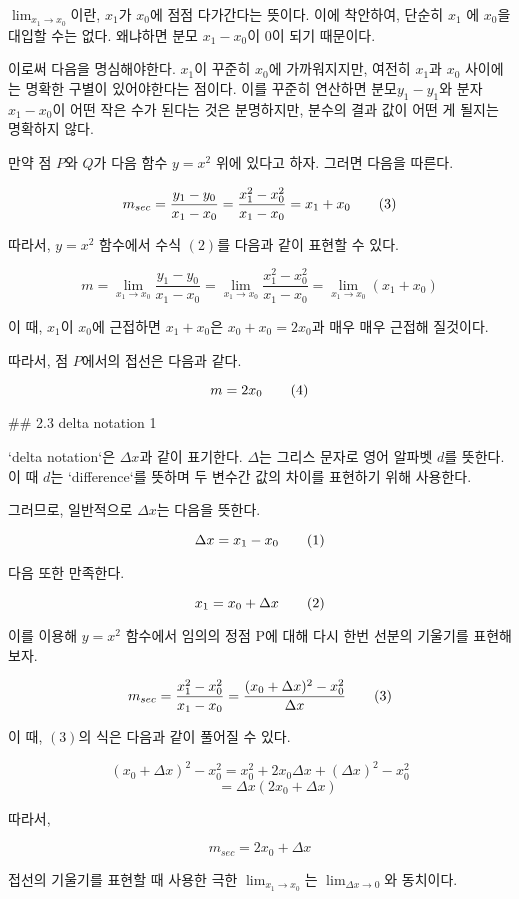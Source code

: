 $\lim_{x_1 \to x_0}$이란, $x_1$가 $x_0$에 점점 다가간다는 뜻이다. 이에 착안하여, 단순히 $x_1$ 에 $x_0$을 대입할 수는 없다. 왜냐하면 분모 ${x_1-x_0}$이 $0$이 되기 때문이다.

이로써 다음을 명심해야한다. $x_1$이 꾸준히 $x_0$에 가까워지지만, 여전히 $x_1$과 $x_0$ 사이에는 명확한 구별이 있어야한다는 점이다. 이를 꾸준히 연산하면 분모$y_1-y_1$와 분자$x_1-x_0$이 어떤 작은 수가 된다는 것은 분명하지만, 분수의 결과 값이 어떤 게 될지는 명확하지 않다.  

만약 점 $P$와 $Q$가 다음 함수 $y = x^2$ 위에 있다고 하자. 그러면 다음을 따른다.

$$m_{sec}=\frac{y_1-y_0}{x_1-x_0}=\frac{x_1^2-x_0^2}{x_1-x_0}=x_1+x_0\tag3$$

따라서, $y=x^2$ 함수에서 수식 $(2)$를 다음과 같이 표현할 수 있다.

$$m = \lim_{x_1 \to x_0}\frac{y_1 - y_0}{x_1 - x_0} = \lim_{x_1 \to x_0}\frac{x_1^2-x_0^2}{x_1-x_0} = \lim_{x_1 \to x_0}({x_1 + x_0})$$

이 때, $x_1$이 $x_0$에 근접하면 $x_1 + x_0$은 $x_0 + x_0= 2x_0$과 매우 매우 근접해 질것이다.

따라서, 점 $P$에서의 접선은 다음과 같다.  

$$m = 2x_0\tag4$$

## 2.3 delta notation 1 

`delta notation`은 $\Delta x$과 같이 표기한다. $\Delta$는 그리스 문자로 영어 알파벳 $d$를 뜻한다. 이 때 $d$는 `difference`를 뜻하며 두 변수간 값의 차이를 표현하기 위해 사용한다.

그러므로, 일반적으로 $\Delta x$는 다음을 뜻한다.  

$$\Delta x = x_1 - x_0 \tag1$$

다음 또한 만족한다.  

$$x_1 = x_0 + \Delta x \tag2$$

이를 이용해 $y=x^2$ 함수에서 임의의 정점 P에 대해 다시 한번 선분의 기울기를 표현해보자.

$$m_{sec}=\frac{x_1^2-x_0^2}{x_1-x_0}=\frac{(x_0+\Delta x)^2-x_0^2}{\Delta x} \tag3$$   

이 때, $(3)$의 식은 다음과 같이 풀어질 수 있다.  


$$
(x_0+\Delta x)^2 - x_0^2  
                = x_0^2+2x_0 \Delta x + (\Delta x)^2 - x_0^2   $$
$$\;\;\;\;\;\;\;\;\;= \Delta x(2x_0 + \Delta x)$$

따라서,  

$$ 
m_{sec} = 2x_0 + \Delta x 
$$ 

접선의 기울기를 표현할 때 사용한 극한 $\lim_{x_1 \to x_0}$는 $\lim_{\Delta x \to 0}$와 동치이다. 

